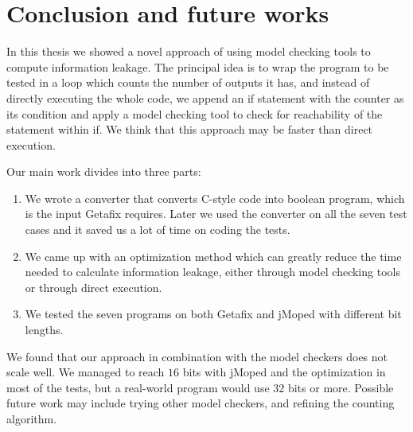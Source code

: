 \chapter{Conclusion and future works}
	\label{CH_summary}

In this thesis we showed a novel approach of using model checking tools to compute information leakage. The principal idea is to wrap the program to be tested in a loop which counts the number of outputs it has, and instead of directly executing the whole code, we append an if statement with the counter as its condition and apply a model checking tool to check for reachability of the statement within if. We think that this approach may be faster than direct execution.

Our main work divides into three parts:
\begin{enumerate}
\item We wrote a converter that converts C-style code into boolean program, which is the input Getafix requires. Later we used the converter on all the seven test cases and it saved us a lot of time on coding the tests. 
\item We came up with an optimization method which can greatly reduce the time needed to calculate information leakage, either through model checking tools or through direct execution.
\item We tested the seven programs on both Getafix and jMoped with different bit lengths.
\end{enumerate}

We found that our approach in combination with the model checkers does not scale well. We managed to reach $16$ bits with jMoped and the optimization in most of the tests, but a real-world program would use $32$ bits or more. Possible future work may include trying other model checkers, and refining the counting algorithm.